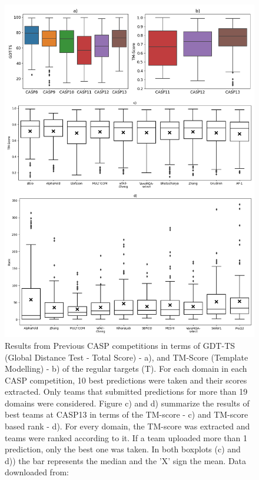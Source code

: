 \begin{figure}
    \centering
    \includegraphics[scale=0.47]{imgs_tomas/casp_analysis_bw.png}
    \caption{Results from Previous CASP competitions in terms of GDT-TS (Global Distance Test - Total Score) - a), and TM-Score (Template Modelling) - b) of the regular targets (T). For each domain in each CASP competition, 10 best predictions were taken and their scores extracted. Only teams that submitted predictions for more than 19 domains were considered.
    Figure c) and d) summarize the results of best teams at CASP13 in terms of the TM-score - c) and TM-score based rank - d). For every domain, the TM-score was extracted and teams were ranked according to it. If a team uploaded more than 1 prediction, only the best one was taken. In both boxplots (c) and d)) the bar represents the median and the 'X' sign the mean. Data downloaded from: \cite{casp}}
    \label{fig:casp}
\end{figure}


